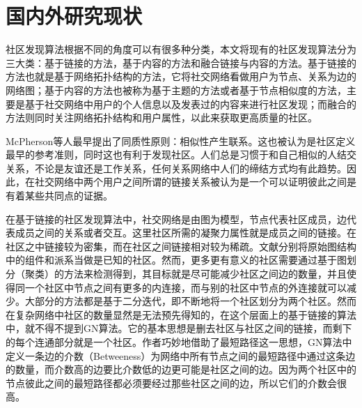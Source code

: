 
\section{国内外研究现状}%
社区发现算法根据不同的角度可以有很多种分类，本文将现有的社区发现算法分为三大类：基于链接的方法，基于内容的方法和融合链接与内容的方法。基于链接的方法也就是基于网络拓扑结构的方法，它将社交网络看做用户为节点、关系为边的网络图；基于内容的方法也被称为基于主题的方法或者基于节点相似度的方法，主要是基于社交网络中用户的个人信息以及发表过的内容来进行社区发现；而融合的方法则同时关注网络拓扑结构和用户属性，以此来获取更高质量的社区。

McPherson等人最早提出了同质性原则：相似性产生联系\cite{Mcpherson2001Birds}。这也被认为是社区定义最早的参考准则，同时这也有利于发现社区。人们总是习惯于和自己相似的人结交关系，不论是友谊还是工作关系，任何关系网络中人们的缔结方式均有此趋势。因此，在社交网络中两个用户之间所谓的链接关系被认为是一个可以证明彼此之间是有着某些共同点的证据。

在基于链接的社区发现算法中，社交网络是由图为模型，节点代表社区成员，边代表成员之间的关系或者交互。这里社区所需的凝聚力属性就是成员之间的链接。在社区之中链接较为密集，而在社区之间链接相对较为稀疏。文献\cite{Fortunato2009Community}分别将原始图结构中的组件和派系当做是已知的社区。然而，更多更有意义的社区需要通过基于图划分（聚类）的方法来检测得到，其目标就是尽可能减少社区之间边的数量，并且使得同一个社区中节点之间有更多的内连接，而与别的社区中节点的外连接就可以减少。大部分的方法都是基于二分迭代，即不断地将一个社区划分为两个社区。然而在复杂网络中社区的数量显然是无法预先得知的，在这个层面上的基于链接的算法中，就不得不提到GN算法\cite{2002Community}。它的基本思想是删去社区与社区之间的链接，而剩下的每个连通部分就是一个社区。作者巧妙地借助了最短路径这一思想，GN算法中定义一条边的介数（Betweeness）为网络中所有节点之间的最短路径中通过这条边的数量，而介数高的边要比介数低的边更可能是社区之间的边。因为两个社区中的节点彼此之间的最短路径都必须要经过那些社区之间的边，所以它们的介数会很高。

